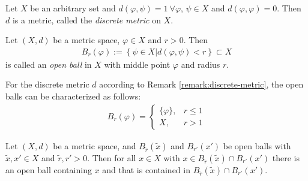 \begin{remark}\label{remark:discrete-metric}
	Let $X$ be an arbitrary set and $d(\varphi, \psi) = 1 \ \forall \varphi$, $\psi\in X$ and $d(\varphi, \varphi) = 0$. Then $d$ is a metric, called the \textit{discrete metric} on $X$. 
\end{remark}

\begin{defn}
	Let $(X, d)$ be a metric space, $\varphi\in X$ and $r > 0$. Then 
	\begin{align}
		B_{r}(\varphi) := \left\{ \psi\in X \vert d(\varphi, \psi) < r\right\} \subset X
	\end{align}
	is called an \textit{open ball} in $X$ with middle point $\varphi$ and radius $r$. 
\end{defn}

\begin{exmp}\label{exmp:open-balls-discrete-metric}
	For the discrete metric $d$ according to Remark \ref{remark:discrete-metric}, the open balls can be characterized as follows:
	\begin{align}
		B_{r}(\varphi) = \begin{cases}
			\{\varphi\}, &r \leq 1 
			\\ X, &r > 1
		\end{cases}
	\end{align}
\end{exmp} 

\begin{theorem}\label{thrm:intersection_open_balls}
	Let $(X, d)$ be a metric space, and $B_{\tilde{r}}(\tilde{x})$ and $B_{r'}(x')$ be open balls with $\tilde{x}, x'\in X$ and $\tilde{r}, r' > 0$. Then for all $x\in X$ with $x\in B_{\tilde{r}}(\tilde{x})\cap B_{r'}(x')$ there is an open ball containing $x$ and that is contained in $B_{\tilde{r}}(\tilde{x})\cap B_{r'}(x')$.
\end{theorem}

